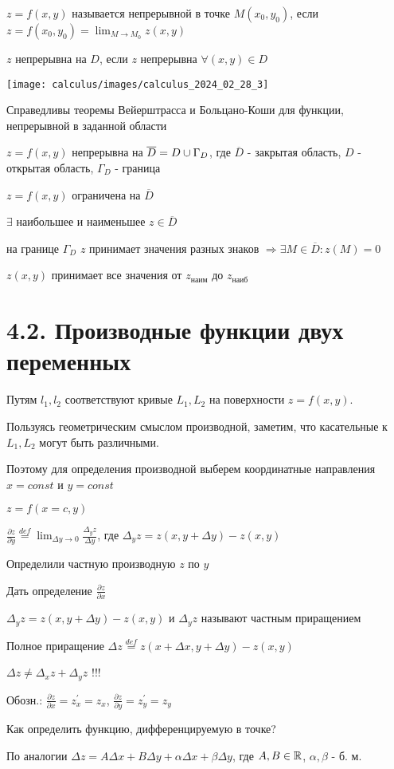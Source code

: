 \documentclass[12pt]{article}
\begin{document}
    \hypertarget{continuityoffunctionoftwovariables}{}
    \Def $z = f(x, y)$ называется непрерывной в точке $M(x_0, y_0)$, если $z = f(x_0, y_0) = \lim_{M \to M_0} z(x, y)$

    $z$ непрерывна на $D$, если $z$ непрерывна $\forall (x, y) \in D$

    \texttt{[image: calculus/images/calculus\_2024\_02\_28\_3]}

    \Nota Справедливы теоремы Вейерштрасса и Больцано-Коши для функции, непрерывной в заданной области

    $z = f(x, y)$ непрерывна на $\overline{D} = D \cup \Gamma_D$, где $\overline{D}$ - закрытая область, $D$ - открытая область, $\Gamma_D$ - граница

     $z = f(x, y)$ ограничена на $\overline{D}$

     $\exists$ наибольшее и наименьшее $z \in \overline{D}$

     на границе $\Gamma_D$ $z$ принимает значения разных знаков $\Longrightarrow \exists M \in \overline{D} : z(M) = 0$

     $z(x, y)$ принимает все значения от $z_{\text{наим}}$ до $z_{\text{наиб}}$ \\[1\baselineskip]

    \section{4.2. Производные функции двух переменных}

    Путям $l_1, l_2$ соответствуют кривые $L_1, L_2$ на поверхности $z = f(x, y)$.

    Пользуясь геометрическим смыслом производной, заметим, что касательные к $L_1, L_2$ могут быть различными.


    Поэтому для определения производной выберем координатные направления $x = const$ и $y = const$

    $z = f(x = c, y)$

    \hypertarget{partialderivativeoffunctionoftwovariables}{}

    $\displaystyle \frac{\partial z}{\partial y} \stackrel{def}{=} \lim_{\Delta y \to 0} \frac{\Delta_y z}{\Delta y}$,
    где $\Delta_y z = z(x, y + \Delta y) - z(x, y)$

    Определили частную производную $z$ по $y$

    \Lab Дать определение $\displaystyle \frac{\partial z}{\partial x}$

    \Nota $\Delta_y z = z(x, y + \Delta y) - z(x, y)$ и  $\Delta_y z$ называют частным приращением

    \Def Полное приращение $\Delta z \stackrel{def}{=} z(x + \Delta x, y + \Delta y) - z(x, y)$

    \Nota $\Delta z \neq \Delta_x z + \Delta_y z$ !!!

    Обозн.: $\displaystyle \frac{\partial z}{\partial x} = z^\prime_x = z_x$, $\displaystyle \frac{\partial z}{\partial y} = z^\prime_y = z_y$

    Как определить функцию, дифференцируемую в точке?

    По аналогии $\Delta z = A \Delta x + B \Delta y + \alpha \Delta x + \beta \Delta y$, где $A, B \in \mathbb{R}$, $\alpha, \beta$ - б. м.
\end{document}
